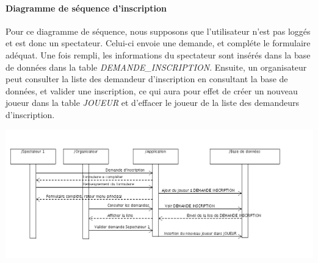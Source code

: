 \documentclass[10pt,a4paper]{report}
\begin{document}
\paragraph{Diagramme de séquence d'inscription} Pour ce diagramme de séquence, nous supposons que l'utilisateur n'est pas loggés et est donc un spectateur. Celui-ci envoie une demande, et compléte le formulaire adéquat. Une fois rempli, les informations du spectateur sont insérés dans la base de données dans la table \textit{DEMANDE\_INSCRIPTION}. Ensuite, un organisateur peut consulter la liste des demandeur d'inscription en consultant la base de données, et valider une inscription, ce qui aura pour effet de créer un nouveau joueur dans la table \textit{JOUEUR} et d'effacer le joueur de la liste des demandeurs d'inscription.
\begin{center}
\includegraphics[width=18cm]{DiagSeqInscr.png}
\end{center}
\end{document}
